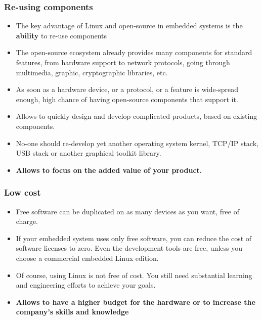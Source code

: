 \begin{frame}
  \frametitle{Re-using components}
  \begin{itemize}
  \item The key advantage of Linux and open-source in embedded systems
    is the {\bf ability} to re-use components
  \item The open-source ecosystem already provides many components for
    standard features, from hardware support to network protocols,
    going through multimedia, graphic, cryptographic libraries, etc.
  \item As soon as a hardware device, or a protocol, or a feature is
    wide-spread enough, high chance of having open-source components
    that support it.
  \item Allows to quickly design and develop complicated products,
    based on existing components.
  \item No-one should re-develop yet another operating system kernel,
    TCP/IP stack, USB stack or another graphical toolkit library.
  \item {\bf Allows to focus on the added value of your product.}
  \end{itemize}
\end{frame}

\begin{frame}
  \frametitle{Low cost}
  \begin{itemize}
  \item Free software can be duplicated on as many devices as you
    want, free of charge.
  \item If your embedded system uses only free software, you can
    reduce the cost of software licenses to zero. Even the development
    tools are free, unless you choose a commercial embedded Linux
    edition.
  \item Of course, using Linux is not free of cost. You still need
    substantial learning and engineering efforts to achieve your
    goals.
  \item {\bf Allows to have a higher budget for the hardware or to
      increase the company’s skills and knowledge}
  \end{itemize}
\end{frame}

